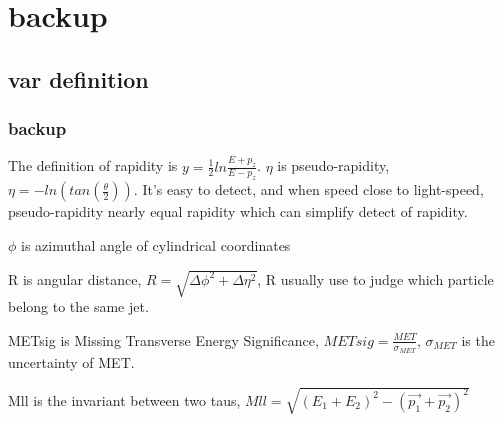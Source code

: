 \documentclass[usenames,dvipsnames]{beamer}
\begin{document}
\section{backup}
\subsection{var definition}
\begin{frame}
	\frametitle{backup}
	The definition of rapidity is $y = \frac{1}{2}ln\frac{E+p_z}{E-p_z}$. $\eta$ is pseudo-rapidity, $\eta = -ln(tan(\frac{\theta}{2})).$ It's easy to detect, and when speed close to light-speed, pseudo-rapidity nearly equal rapidity which can simplify detect of rapidity.
	
	$\phi$ is azimuthal angle of cylindrical coordinates
	
	R is angular distance, $R = \sqrt{\Delta\phi^2+\Delta\eta^2}$, R usually use to judge which particle belong to the same jet.
	
	METsig is Missing Transverse Energy Significance, $METsig = \frac{MET}{\sigma_{MET}}$, $\sigma_{MET}$ is the uncertainty of MET.
	
	Mll is the invariant between two taus, $Mll = \sqrt{(E_1 + E_2)^2 - (\vec{p_1}+\vec{p_2})^2}$
\end{frame}
\end{document}
